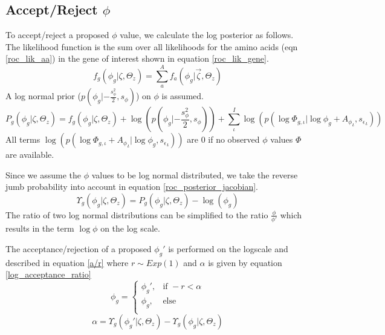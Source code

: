 \documentclass[11pt]{article}
\begin{document}
  \subsection{Accept/Reject $\phi$}
  To accept/reject a proposed $\phi$ value, we calculate the log posterior as follows.
  The likelihood function is the sum over all likelihoods for the amino acids (eqn \ref{roc_lik_aa}) in the gene of interest shown in equation \ref{roc_lik_gene}.
  \begin{equation}
    f_g(\phi_g|\zeta, \Theta_z) = \sum_a^A f_a(\phi_g|\vec{\zeta}, \Theta_z)
    \label{roc_lik_gene}
  \end{equation}
  A log normal prior ($p(\phi_g|-\frac{s_{\phi}^2}{2}, s_{\phi})$) on $\phi$ is assumed.
  \begin{equation}
    P_g(\phi_g|\zeta, \Theta_z) = f_g(\phi_g|\zeta, \Theta_z) + \log(p(\phi_g|-\frac{s_{\phi}^2}{2}, s_{\phi})) + \sum_{\iota}^I \log(p(\log{\Phi_{g,\iota}}| \log{\phi_g} + {A_{\phi}}_{\iota}, {s_{\epsilon}}_{\iota}))
    \label{roc_posterior}
  \end{equation}
  All terms $\log(p(\log{\Phi_{g,\iota}} + {A_{\phi}}_{\iota}| \log{\phi_g}, {s_{\epsilon}}_{\iota}))$ are $0$ if no observed $\phi$ values $\Phi$ are available. 
  
  Since we assume the $\phi$ values to be log normal distributed, we take the reverse jumb probability into account in equation \ref{roc_posterior_jacobian}.
  \begin{equation}
    \Upsilon_g(\phi_g|\zeta, \Theta_z) = P_g(\phi_g|\zeta, \Theta_z) - \log(\phi_g)
    \label{roc_posterior_jacobian}
  \end{equation}
  The ratio of two log normal distributions can be simplified to the ratio $\frac{\phi}{\phi'}$ which results in the term $\log{\phi}$ on the log scale.
  
  The acceptance/rejection of a proposed $\phi_g'$ is performed on the logscale and described in equation \ref{a/r} where $r \sim Exp(1)$ and $\alpha$ is given by equation \ref{log_acceptance_ratio}
  \begin{equation}
    \phi_g = 
    \begin{cases}
      \phi_g',	& \text{if } -r < \alpha \\
      \phi_g,	& \text{else } \\
    \end{cases}
     \label{a/r}
  \end{equation}  
  \begin{equation}
    \alpha = \Upsilon_g(\phi_g'|\zeta, \Theta_z) - \Upsilon_g(\phi_g|\zeta, \Theta_z)
    \label{log_acceptance_ratio}
  \end{equation}
  
\end{document}
